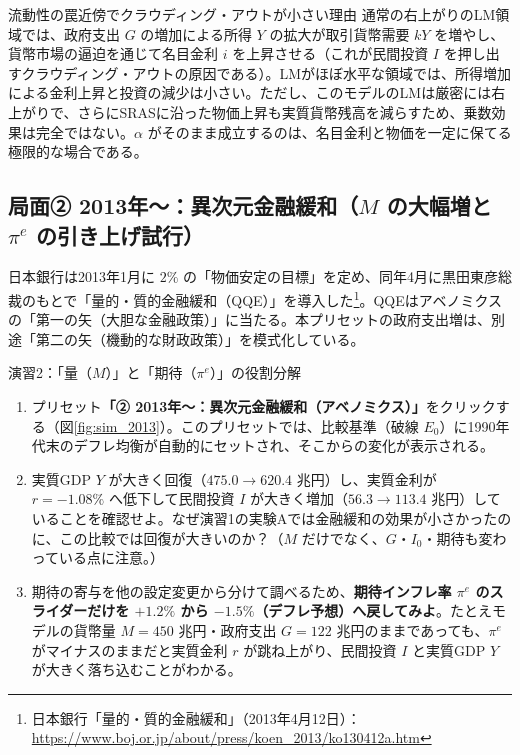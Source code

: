 \documentclass[lualatex,a4paper,11pt,ja=standard]{bxjsarticle}
\begin{document}
\begin{theorybox}{流動性の罠近傍でクラウディング・アウトが小さい理由}
通常の右上がりのLM領域では、政府支出 $G$ の増加による所得 $Y$ の拡大が取引貨幣需要 $kY$ を増やし、貨幣市場の逼迫を通じて名目金利 $i$ を上昇させる（これが民間投資 $I$ を押し出すクラウディング・アウトの原因である）。LMがほぼ水平な領域では、所得増加による金利上昇と投資の減少は小さい。ただし、このモデルのLMは厳密には右上がりで、さらにSRASに沿った物価上昇も実質貨幣残高を減らすため、乗数効果は完全ではない。$\alpha$ がそのまま成立するのは、名目金利と物価を一定に保てる極限的な場合である。
\end{theorybox}

\subsection{局面② 2013年〜：異次元金融緩和（\texorpdfstring{$M$}{M} の大幅増と \texorpdfstring{$\pi^e$}{πe} の引き上げ試行）}

日本銀行は2013年1月に $2\%$ の「物価安定の目標」を定め、同年4月に黒田東彦総裁のもとで「量的・質的金融緩和（QQE）」を導入した\footnote{日本銀行「量的・質的金融緩和」（2013年4月12日）：\url{https://www.boj.or.jp/about/press/koen_2013/ko130412a.htm}}。QQEはアベノミクスの「第一の矢（大胆な金融政策）」に当たる。本プリセットの政府支出増は、別途「第二の矢（機動的な財政政策）」を模式化している。

\begin{simbox}{演習2：「量（$M$）」と「期待（$\pi^e$）」の役割分解}
\begin{enumerate}[leftmargin=6mm]
  \item プリセット\textbf{「② 2013年〜：異次元金融緩和（アベノミクス）」}をクリックする（図\ref{fig:sim_2013}）。このプリセットでは、比較基準（破線 $E_0$）に1990年代末のデフレ均衡が自動的にセットされ、そこからの変化が表示される。
  \item 実質GDP $Y$ が大きく回復（$475.0 \to 620.4$ 兆円）し、実質金利が $r = -1.08\%$ へ低下して民間投資 $I$ が大きく増加（$56.3 \to 113.4$ 兆円）していることを確認せよ。なぜ演習1の実験Aでは金融緩和の効果が小さかったのに、この比較では回復が大きいのか？（$M$ だけでなく、$G$・$I_0$・期待も変わっている点に注意。）
  \item 期待の寄与を他の設定変更から分けて調べるため、\textbf{期待インフレ率 $\pi^e$ のスライダーだけを $+1.2\%$ から $-1.5\%$（デフレ予想）へ戻してみよ}。たとえモデルの貨幣量 $M = 450$ 兆円・政府支出 $G = 122$ 兆円のままであっても、$\pi^e$ がマイナスのままだと実質金利 $r$ が跳ね上がり、民間投資 $I$ と実質GDP $Y$ が大きく落ち込むことがわかる。
\end{enumerate}
\end{simbox}
\end{document}
